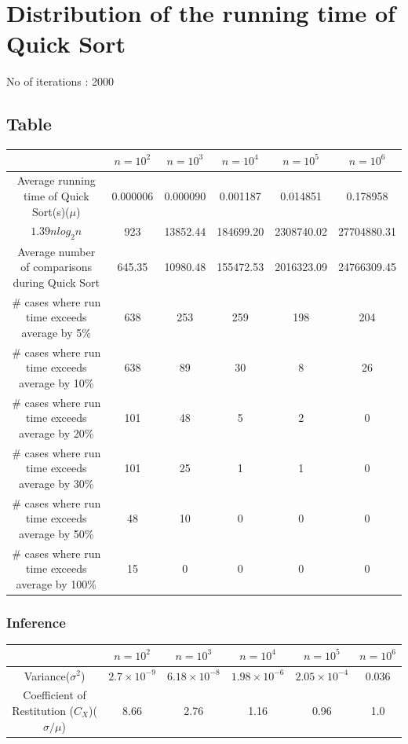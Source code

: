 \documentclass{article}
\begin{document}


\section{Distribution of the running time of Quick Sort}

No of iterations : 2000
\subsection{Table}

\begin{center}
\begin{tabular}{||c|c|c|c|c|c||}
\hline
 		&  $n=10^2$ & $n=10^3$ &$n=10^4$  & $n=10^5$ &$n=10^6$   \\
\hline
Average running time of Quick Sort(s)($\mu$) &
0.000006&
0.000090&
0.001187&
0.014851&
0.178958\\
\hline
$1.39nlog_{2}n$ & 923 & 13852.44 &184699.20 &2308740.02 &27704880.31 \\ 
\hline
Average number of comparisons during Quick Sort & 
645.35&
10980.48&
155472.53&
2016323.09&
24766309.45 \\
\hline
\# cases where run time exceeds average by 5\% & 638& 253&259 &198 &204 \\
\hline
\# cases where run time exceeds average by 10\% & 638&89 & 30& 8&26 \\
\hline
\# cases where run time exceeds average by 20\% & 101& 48& 5& 2& 0\\
\hline
\# cases where run time exceeds average by 30\% & 101&25 & 1&1 & 0\\
\hline
\# cases where run time exceeds average by 50\% & 48& 10& 0& 0& 0\\
\hline
\# cases where run time exceeds average by 100\% & 15& 0& 0& 0& 0\\
\hline
\end{tabular}
\end{center}

\subsubsection{Inference}
\begin{center}
\begin{tabular}{||c|c|c|c|c|c||}
\hline
        &  $n=10^2$ & $n=10^3$ &$n=10^4$  & $n=10^5$ &$n=10^6$   \\
	\hline	
Variance($\sigma^2$) &$2.7\times10^{-9}$ &$6.18\times10^{-8}$ & $1.98\times10^{-6}$&$2.05\times10^{-4}$ & 0.036\\
\hline
Coefficient of Restitution ($C_{X}$)($\sigma/\mu$) &8.66 & 2.76 & 1.16 & 0.96 &1.0  \\
\hline
\end{tabular}
\end{center}
\end{document}
